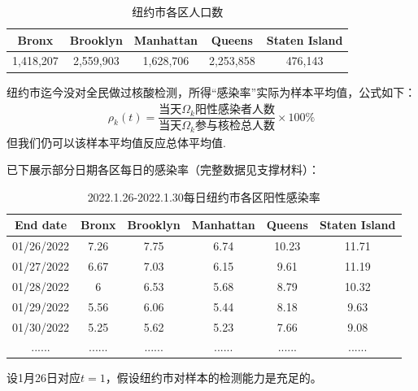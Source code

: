 \documentclass[withoutpreface,bwprint]{cumcmthesis} %
\begin{document}
\begin{table}[H]
\centering
\begin{tabular}{ccccc}
\toprule
Bronx &Brooklyn & Manhattan & Queens    & Staten Island \\
\midrule
1,418,207 & 2,559,903 & 1,628,706 & 2,253,858 &476,143     \\  
\bottomrule
\end{tabular}
\caption{纽约市各区人口数}
\end{table}
纽约市迄今没对全民做过核酸检测，所得“感染率”实际为样本平均值，公式如下：
\begin{align*}
  \rho_k(t)=  \dfrac{\mbox{当天} \Omega_{k} \mbox{阳性感染者人数}}{\mbox{当天} \Omega_{k} \mbox{参与核检总人数}}\times 100\%
\end{align*}
但我们仍可以该样本平均值反应总体平均值.

已下展示部分日期各区每日的感染率（完整数据见支撑材料）：
\begin{table}[H]
\centering
\begin{tabular}{cccccc}
\toprule
End date   & Bronx & Brooklyn & Manhattan & Queens & Staten Island \\ 
\midrule
01/26/2022 & 7.26  & 7.75     & 6.74      & 10.23  & 11.71         \\
01/27/2022 & 6.67  & 7.03     & 6.15      & 9.61   & 11.19         \\
01/28/2022 & 6     & 6.53     & 5.68      & 8.79   & 10.32         \\
01/29/2022 & 5.56  & 6.06     & 5.44      & 8.18   & 9.63          \\
01/30/2022 & 5.25  & 5.62     & 5.23      & 7.66   & 9.08          \\
......     & ...... &...... &...... &...... &...... \\
\bottomrule
\end{tabular}
\caption{2022.1.26-2022.1.30每日纽约市各区阳性感染率}
\end{table}
设1月26日对应$t=1$，假设纽约市对样本的检测能力是充足的。
\end{document}
